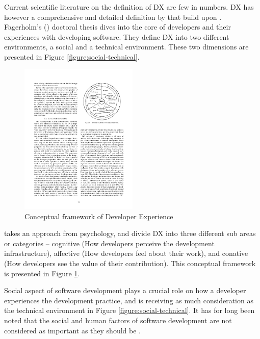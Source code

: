 \documentclass[english, 12pt, a4paper, sci, utf8, a-1b, online]{aaltothesis}
\begin{document}
Current scientific literature on the definition of DX are few in numbers. DX has however a comprehensive and detailed definition by \textcite{fagerholm-doctoral-thesis} that build upon \textcite{fagerholm-dx-concept-and-definition}. Fagerholm's (\citeyear{fagerholm-doctoral-thesis}) doctoral thesis dives into the core of developers and their experiences with developing software. They define DX into two different environments, a social and a technical environment. These two dimensions are presented in Figure \ref{figure:social-technical}.

\begin{figure}[H]
  \begin{center}
    \includegraphics[width=0.5\textwidth]{dx-conceptual.pdf}
  \end{center}
  \captionsetup{width=0.5\textwidth}
  \caption{Conceptual framework of Developer Experience \parencite{fagerholm-dx-concept-and-definition}}
  \label{figure:conceptual-framework}
\end{figure}

\textcite{fagerholm-dx-concept-and-definition} takes an approach from psychology, and divide DX into three different sub areas or categories – cognitive (How developers perceive the development infrastructure), affective (How developers feel about their work), and conative (How developers see the value of their contribution). This conceptual framework is presented in Figure \ref{figure:conceptual-framework}.

Social aspect of software development plays a crucial role on how a developer experiences the development practice, and is receiving as much consideration as the technical environment in Figure \ref{figure:social-technical}. It has for long been noted that the social and human factors of software development are not considered as important as they should be \parencite{human-factor}.
\end{document}
